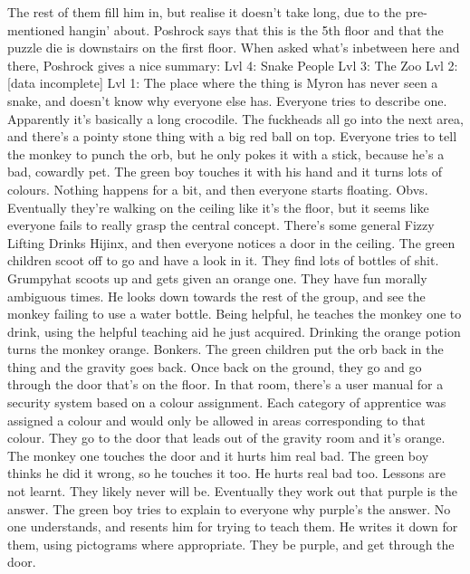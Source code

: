 The rest of them fill him in, but realise it doesn’t take long, due to the pre-mentioned hangin’ about.\medskip
Poshrock says that this is the 5th floor and that the puzzle die is downstairs on the first floor.\medskip
When asked what’s inbetween here and there, Poshrock gives a nice summary:\medskip
Lvl 4: Snake People Lvl 3: The Zoo Lvl 2: [data incomplete] Lvl 1: The place where the thing is\medskip
Myron has never seen a snake, and doesn’t know why everyone else has. Everyone tries to describe one. Apparently it’s basically a long crocodile.\medskip
The fuckheads all go into the next area, and there’s a pointy stone thing with a big red ball on top. Everyone tries to tell the monkey to punch the orb, but he only pokes it with a stick, because he’s a bad, cowardly pet.\medskip
The green boy touches it with his hand and it turns lots of colours. Nothing happens for a bit, and then everyone starts floating. Obvs.\medskip
Eventually they’re walking on the ceiling like it’s the floor, but it seems like everyone fails to really grasp the central concept.\medskip
There’s some general Fizzy Lifting Drinks Hijinx, and then everyone notices a door in the ceiling.\medskip
The green children scoot off to go and have a look in it. They find lots of bottles of shit. Grumpyhat scoots up and gets given an orange one.\medskip
They have fun morally ambiguous times.\medskip
He looks down towards the rest of the group, and see the monkey failing to use a water bottle.\medskip
Being helpful, he teaches the monkey one to drink, using the helpful teaching aid he just acquired.\medskip
Drinking the orange potion turns the monkey orange. Bonkers.\medskip
The green children put the orb back in the thing and the gravity goes back.\medskip
Once back on the ground, they go and go through the door that’s on the floor.\medskip
In that room, there’s a user manual for a security system based on a colour assignment. Each category of apprentice was assigned a colour and would only be allowed in areas corresponding to that colour.\medskip
They go to the door that leads out of the gravity room and it’s orange.\medskip
The monkey one touches the door and it hurts him real bad. The green boy thinks he did it wrong, so he touches it too. He hurts real bad too. Lessons are not learnt. They likely never will be.\medskip
Eventually they work out that purple is the answer.\medskip
The green boy tries to explain to everyone why purple’s the answer. No one understands, and resents him for trying to teach them. He writes it down for them, using pictograms where appropriate.\medskip
They be purple, and get through the door.\medskip
